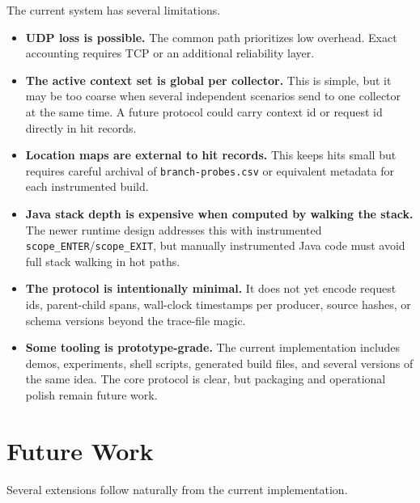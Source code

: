 \documentclass[11pt]{article}
\newcommand{\code}[1]{\texttt{#1}}
\begin{document}
The current system has several limitations.

\begin{itemize}
  \item \textbf{UDP loss is possible.} The common path prioritizes low
  overhead. Exact accounting requires TCP or an additional reliability layer.

  \item \textbf{The active context set is global per collector.} This is simple,
  but it may be too coarse when several independent scenarios send to one
  collector at the same time. A future protocol could carry context id or
  request id directly in hit records.

  \item \textbf{Location maps are external to hit records.} This keeps hits
  small but requires careful archival of \code{branch-probes.csv} or equivalent
  metadata for each instrumented build.

  \item \textbf{Java stack depth is expensive when computed by walking the
  stack.} The newer runtime design addresses this with instrumented
  \code{scope\_ENTER}/\code{scope\_EXIT}, but manually instrumented Java code
  must avoid full stack walking in hot paths.

  \item \textbf{The protocol is intentionally minimal.} It does not yet encode
  request ids, parent-child spans, wall-clock timestamps per producer, source
  hashes, or schema versions beyond the trace-file magic.

  \item \textbf{Some tooling is prototype-grade.} The current implementation
  includes demos, experiments, shell scripts, generated build files, and
  several versions of the same idea. The core protocol is clear, but packaging
  and operational polish remain future work.
\end{itemize}

\section{Future Work}

Several extensions follow naturally from the current implementation.
\end{document}
